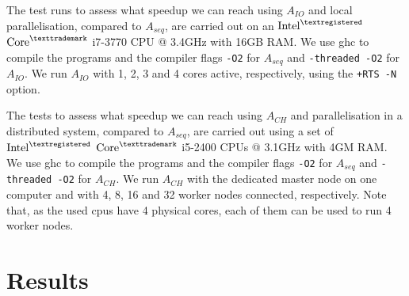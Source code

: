 The test runs to assess what speedup we can reach using $A_{IO}$ and local parallelisation, compared to $A_{seq}$, are carried out on an $\text{Intel}^{\textregistered}$ $\text{Core}^{\texttrademark}$ i7-3770 CPU @ 3.4GHz with 16GB RAM. We use \textsf{ghc} to compile the programs and the compiler flags \texttt{-O2} for $A_{seq}$ and \texttt{-threaded -O2} for $A_{IO}$. We run $A_{IO}$ with 1, 2, 3 and 4 cores active, respectively,  using the \texttt{+RTS -N} option.

The tests to assess what speedup we can reach using $A_{CH}$ and parallelisation in a distributed system, compared to $A_{seq}$, are carried out using a set of $\text{Intel}^{\textregistered}$ $\text{Core}^{\texttrademark}$ i5-2400 CPUs @ 3.1GHz with 4GM RAM. We use \textsf{ghc} to compile the programs and the compiler flags \texttt{-O2} for $A_{seq}$ and \texttt{-threaded -O2} for $A_{CH}$. We run $A_{CH}$ with the dedicated master node on one computer and with 4, 8, 16 and 32 worker nodes connected, respectively. Note that, as the used cpus have 4 physical cores, each of them can be used to run 4 worker nodes.

\section{Results}

